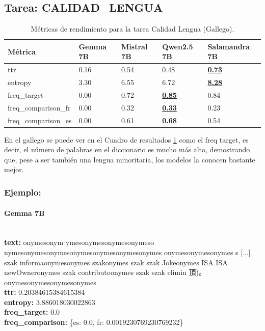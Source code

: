 \subsection{Tarea: CALIDAD\_LENGUA}\label{tarea-calidad_lengua}
\begin{longtable}[]{@{}lllll@{}}
\toprule\noalign{}
Métrica & Gemma 7B & Mistral 7B & Qwen2.5 7B & Salamandra 7B \\
\midrule\noalign{}
\endhead
\bottomrule\noalign{}
\caption{Métricas de rendimiento para la tarea Calidad Lengua (Gallego).}
\label{tab:metricas_calidad_lengua_Gallego}
\endlastfoot
ttr & 0.16 & 0.54 & 0.48 & \textbf{\underline{0.73}} \\
entropy & 3.30 & 6.55 & 6.72 & \textbf{\underline{8.28}} \\
freq\_target & 0.00 & 0.72 & \textbf{\underline{0.85}} & 0.84 \\
freq\_comparison\_fr & 0.00 & 0.32 & \textbf{\underline{0.33}} & 0.23 \\
freq\_comparison\_es & 0.00 & 0.61 & \textbf{\underline{0.68}} & 0.54 \\
\end{longtable}
En el gallego se puede ver en el Cuadro de resultados \ref{tab:metricas_calidad_lengua_Gallego} como el freq target, es decir, el número de palabras en el diccionario es mucho más alto, demostrando que, pese a ser también una lengua minoritaria, los modelos la conocen bastante mejor.

\subsubsection{Ejemplo:}

\paragraph{Gemma 7B}~\\
\textbf{text:} onymesonym ymesonymesonymesonymeso nymesonymesonymesonymesonymesonymesonymes onymesonymesonymes s [...] szak informaonymesonymes szakonymes szak szak Jokeonymes ISA ISA newOwneronymes szak contributoonymes szak szak elimin 頂)。onymesonymesonymesonymes\\
\textbf{ttr:} 0.20384615384615384\\
\textbf{entropy:} 3.886018030022863\\
\textbf{freq\_target:} 0.0\\
\textbf{freq\_comparison:} \{\textquotesingle{}es\textquotesingle{}: 0.0, \textquotesingle{}fr\textquotesingle{}: 0.0019230769230769232\}

